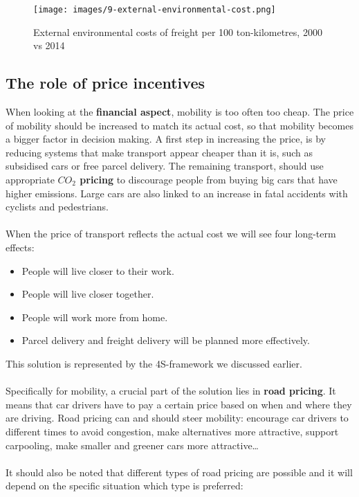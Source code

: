 \documentclass[../summary.tex]{subfiles}
\begin{document}
	\begin{figure}[H]
		\centering
		\texttt{[image: images/9-external-environmental-cost.png]}
		\caption{External environmental costs of freight per 100 ton-kilometres, 2000 vs 2014}
		\label{fig:external-environmental-costs}
	\end{figure}
	\newpage
	
	\subsection{The role of price incentives}

	When looking at the \textbf{financial aspect}, mobility is too often too cheap. The price of mobility should be increased to match its actual cost, so that mobility becomes a bigger factor in decision making. A first step in increasing the price, is by reducing systems that make transport appear cheaper than it is, such as subsidised cars or free parcel delivery. The remaining transport, should use appropriate \textbf{\boldmath $CO_2$ pricing} to discourage people from buying big cars that have higher emissions. Large cars are also linked to an increase in fatal accidents with cyclists and pedestrians.
	\\\\
	When the price of transport reflects the actual cost we will see four long-term effects:
	\begin{itemize}
		\setlength{\itemsep}{0pt}
		\item People will live closer to their work.
		\item People will live closer together.
		\item People will work more from home.
		\item Parcel delivery and freight delivery will be planned more effectively.
	\end{itemize}
	This solution is represented by the 4S-framework we discussed earlier.
	\\\\
	Specifically for mobility, a crucial part of the solution lies in \textbf{road pricing}. It means that car drivers have to pay a certain price based on when and where they are driving. Road pricing can and should steer mobility: encourage car drivers to different times to avoid congestion, make alternatives more attractive, support carpooling, make smaller and greener cars more attractive…
	\\\\
	It should also be noted that different types of road pricing are possible and it will depend on the specific situation which type is preferred:
\end{document}
